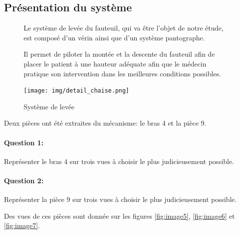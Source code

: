 \subsection{Présentation du système}

\begin{figure}[htbp]
\begin{minipage}[c]{.5\linewidth}
Le système de levée du fauteuil, qui va être l'objet de notre étude, est composé d'un vérin ainsi que d'un système pantographe.

Il permet de piloter la montée et la descente du fauteuil afin de placer le patient à une hauteur adéquate afin que le médecin pratique son intervention dans les meilleures conditions possibles.
\end{minipage}
\hfill
\begin{minipage}[c]{.45\linewidth}
\begin{center}
\texttt{[image: img/detail\_chaise.png]}
\caption{Système de levée}
\label{fig:image4}
\end{center}
\end{minipage}
\end{figure}

Deux pièces ont été extraites du mécanisme: le bras 4 et la pièce 9.

\paragraph{Question 1:}

Représenter le bras 4 sur trois vues à choisir le plus judicieusement possible.

\paragraph{Question 2:}

Représenter la pièce 9 sur trois vues à choisir le plus judicieusement possible.

Des vues de ces pièces sont donnée sur les figures \ref{fig:image5}, \ref{fig:image6} et \ref{fig:image7}.

